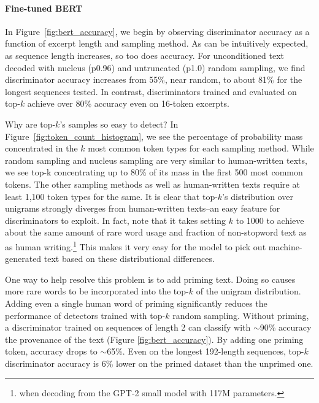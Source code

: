 \paragraph{Fine-tuned BERT} In Figure~\ref{fig:bert_accuracy}, we begin by observing discriminator accuracy as a function of excerpt length and sampling method.
As can be intuitively expected, as sequence length increases, so too does accuracy.
For unconditioned text decoded with nucleus (p0.96) and untruncated (p1.0) random sampling, we find discriminator accuracy increases from 55\%, near random, to about 81\% for the longest sequences tested.
In contrast, discriminators trained and evaluated on top-$k$ achieve over 80\% accuracy even on 16-token excerpts.

Why are top-$k$'s samples so easy to detect?
In Figure~\ref{fig:token_count_histogram}, we see the percentage of probability mass concentrated in the $k$ most common token types for each sampling method.
While random sampling and nucleus sampling are very similar to human-written texts, we see top-k concentrating up to 80\% of its mass in the first 500 most common tokens.
The other sampling methods as well as human-written texts require at least 1,100 token types for the same.
It is clear that top-$k$'s distribution over unigrams strongly diverges from human-written texts--an easy feature for discriminators to exploit.
In fact, \citet{see2019massively} note that it takes setting $k$ to 1000 to achieve about the same amount of rare word usage and fraction of non-stopword text as as human writing.\footnote{when decoding from the GPT-2 small model with 117M parameters.}
This makes it very easy for the model to pick out machine-generated text based on these distributional differences.

One way to help resolve this problem is to add priming text.
Doing so causes more rare words to be incorporated into the top-$k$ of the unigram distribution.
Adding even a single human word of priming significantly reduces the performance of detectors trained with top-$k$ random sampling.
Without priming, a discriminator trained on sequences of length 2 can classify with $\mathtt{\sim}$90\% accuracy the provenance of the text (Figure \ref{fig:bert_accuracy}).
By adding one priming token, accuracy drops to $\mathtt{\sim}$65\%.
Even on the longest 192-length sequences, top-$k$ discriminator accuracy is 6\% lower on the primed dataset than the unprimed one.

